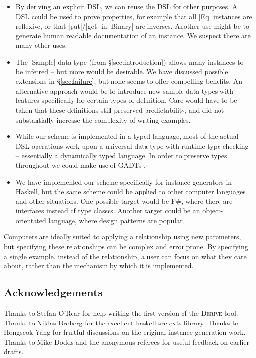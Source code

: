\documentclass{llncs}
\newcommand{\derive}{\textsc{Derive}}
\begin{document}
\begin{itemize}
\item By deriving an explicit DSL, we can reuse the DSL for other purposes. A DSL could be used to prove properties, for example that all |Eq| instances are reflexive, or that |put|/|get| in |Binary| are inverses. Another use might be to generate human readable documentation of an instance. We suspect there are many other uses.
\item The |Sample| data type (from \S\ref{sec:introduction}) allows many instances to be inferred -- but more would be desirable. We have discussed possible extensions in \S\ref{sec:failure}, but none seems to offer compelling benefits. An alternative approach would be to introduce new sample data types with features specifically for certain types of definition. Care would have to be taken that these definitions still preserved predictability, and did not substantially increase the complexity of writing examples.
\item While our scheme is implemented in a typed language, most of the actual DSL operations work upon a universal data type with runtime type checking -- essentially a dynamically typed language. In order to preserve types throughout we could make use of GADTs \cite{spj:gadt}.
\item We have implemented our scheme specifically for instance generators in Haskell, but the same scheme could be applied to other computer languages and other situations. One possible target would be F\#, where there are interfaces instead of type classes. Another target could be an object-orientated language, where design patterns \cite{design_patterns} are popular.
\end{itemize}

Computers are ideally suited to applying a relationship using new parameters, but specifying these relationships can be complex and error prone. By specifying a single example, instead of the relationship, a user can focus on what they care about, rather than the mechanism by which it is implemented.

\subsection*{Acknowledgements}

Thanks to Stefan O'Rear for help writing the first version of the \derive{} tool. Thanks to Niklas Broberg for the excellent haskell-src-exts library. Thanks to Hongseok Yang for fruitful discussions on the original instance generation work. Thanks to Mike Dodds and the anonymous referees for useful feedback on earlier drafts.
\end{document}
